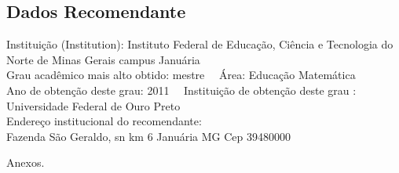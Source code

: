 \documentclass[11pt]{article}
\begin{document}
\subsection*{Dados Recomendante} 
	Instituição (Institution): Instituto Federal de Educação, Ciência e Tecnologia do Norte de Minas Gerais campus Januária
\\ 
	Grau acadêmico mais alto obtido: mestre
	\ \ Área: Educação Matemática
	\\
	Ano de obtenção deste grau: 2011
	\ \ 
	Instituição de obtenção deste grau : Universidade Federal de Ouro Preto
	\\ 
	Endereço institucional do recomendante: \\ Fazenda São Geraldo, sn km 6
Januária MG
Cep 39480000 
\begin{center}
Anexos.
\end{center}
\end{document}
